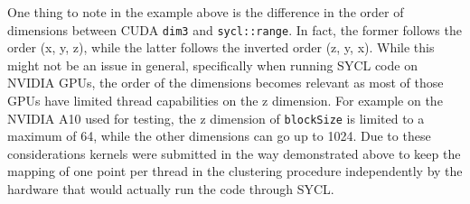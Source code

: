 One thing to note in the example above is the difference in the order of dimensions between CUDA \texttt{dim3} and \texttt{sycl::range}. In fact, the former follows the order (x, y, z), while the latter follows the inverted order (z, y, x). While this might not be an issue in general, specifically when running SYCL code on NVIDIA GPUs, the order of the dimensions becomes relevant as most of those GPUs have limited thread capabilities on the z dimension. For example on the NVIDIA A10 used for testing, the z dimension of \texttt{blockSize} is limited to a maximum of 64, while the other dimensions can go up to 1024.
Due to these considerations kernels were submitted in the way demonstrated above to keep the mapping of one point per thread in the clustering procedure independently by the hardware that would actually run the code through SYCL. 

